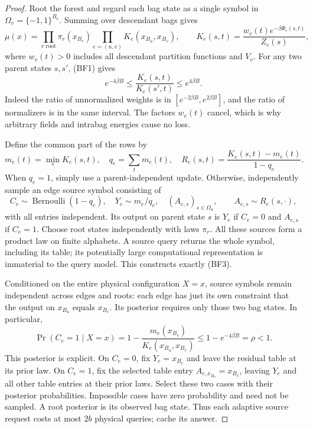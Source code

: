 \begin{proof}
Root the forest and regard each bag state as a single symbol in
$\Omega_v=\{-1,1\}^{B_v}$. Summing over descendant bags gives
\[
 \mu(x)=\prod_{r\text{ root}}\pi_r(x_{B_r})
             \prod_{e=(u,v)}K_e(x_{B_u},x_{B_v}),\qquad
 K_e(s,t)=\frac{w_v(t)e^{-\beta\Phi_e(s,t)}}{Z_e(s)},
 \tag{BF3}
\]
where $w_v(t)>0$ includes all descendant partition functions and
$V_v$. For any two parent states $s,s'$, (BF1) gives
\[
 e^{-4\beta B}\le\frac{K_e(s,t)}{K_e(s',t)}
                         \le e^{4\beta B}.
 \tag{BF4}
\]
Indeed the ratio of unnormalized weights is in
$[e^{-2\beta B},e^{2\beta B}]$, and the ratio of normalizers is
in the same interval. The factors $w_v(t)$ cancel, which is why
arbitrary fields and intrabag energies cause no loss.

Define the common part of the rows by
\[
 m_e(t)=\min_sK_e(s,t),\quad q_e=\sum_t m_e(t),\quad
 R_e(s,t)=\frac{K_e(s,t)-m_e(t)}{1-q_e}.
\]
When $q_e=1$, simply use a parent-independent update. Otherwise,
independently sample an edge source symbol consisting of
\[
 C_e\sim\operatorname{Bernoulli}(1-q_e),\quad
 Y_e\sim m_e/q_e,\quad
 (A_{e,s})_{s\in\Omega_u},\qquad A_{e,s}\sim R_e(s,\cdot),
 \tag{BF5}
\]
with all entries independent. Its output on parent state $s$ is
$Y_e$ if $C_e=0$ and $A_{e,s}$ if $C_e=1$.
Choose root states independently with laws $\pi_r$.
All these sources form a product law on finite alphabets. A source
query returns the whole symbol, including its table; its potentially
large computational representation is immaterial to the query model.
This constructs exactly (BF3).

Conditioned on the entire physical configuration $X=x$, source
symbols remain independent across edges and roots: each edge has
just its own constraint that the output on $x_{B_u}$ equals
$x_{B_v}$. Its posterior requires only those two bag states. In
particular,
\[
 \Pr(C_e=1\mid X=x)
 =1-\frac{m_e(x_{B_v})}{K_e(x_{B_u},x_{B_v})}
 \le1-e^{-4\beta B}=\rho<1.
 \tag{BF6}
\]
This posterior is explicit. On $C_e=0$, fix $Y_e=x_{B_v}$ and
leave the residual table at its prior law. On $C_e=1$, fix the
selected table entry $A_{e,x_{B_u}}=x_{B_v}$, leaving $Y_e$ and
all other table entries at their prior laws. Select these two cases
with their posterior probabilities. Impossible cases have zero
probability and need not be sampled. A root posterior is its observed
bag state. Thus each adaptive source request costs at most $2b$
physical queries; cache its answer.


\end{proof}
